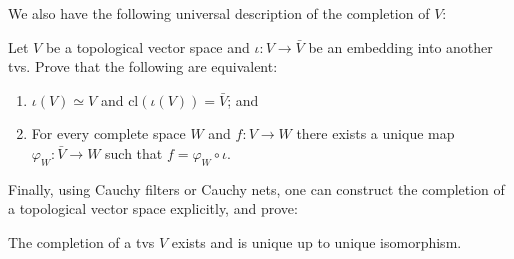 \documentclass[12pt, reqno,a4paper, twoside]{amsproc}
\newcommand{\id}{\mathbf{1}}
\newcommand{\cl}[1]{\mathrm{cl}\left(#1\right)}
\newenvironment{sol}{\sc Solution. \rm}{\hfill \qedsymbol\bigskip}
\begin{document}
We also have the following universal description of the completion of $V$:
\begin{exer}
	Let $V$ be a topological vector space and $\iota:V\to \bar{V}$ be an embedding into another tvs. Prove that the following are equivalent:
	\begin{enumerate}
		\item $\iota(V)\simeq V$ and $\cl{\iota(V)}=\bar{V}$; and
		\item For every complete space $W$ and $f:V\to W$ there exists a unique map $\varphi_W:\bar{V}\to W$ such that $f=\varphi_W\circ\iota$.
	\end{enumerate}
\end{exer}
%	
%	
Finally, using Cauchy filters or Cauchy nets, one can construct the completion of a topological vector space explicitly, and prove:
\begin{exer}
	The completion of a tvs $V$ exists and is unique up to unique isomorphism.
\end{exer}
\end{document}
